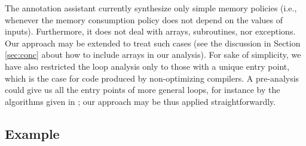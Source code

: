 
The annotation assistant currently synthesize only simple
memory policies (i.e., whenever the memory consumption policy does not depend on
the values of inputs).
Furthermore, it does not deal with arrays, subroutines, nor exceptions. Our approach may be extended to treat such cases (see the discussion in Section \ref{sec:conc} about how to include arrays in our analysis). For sake of simplicity,
we have also restricted the loop analysis only to those with a unique
entry point, which is the case for code produced by non-optimizing
compilers. A pre-analysis could give us all the entry points of more
general loops, for instance by the algorithms given in \cite{CJPS05cmu}; our approach may be thus applied straightforwardly.

\subsection{Example}

